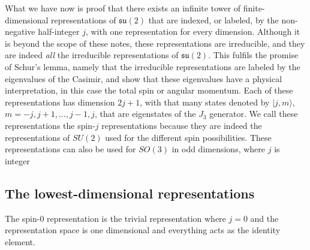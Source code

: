 \documentclass[notes.tex]{subfiles}
\begin{document}
What we have now is proof that there exists an infinite tower of finite-dimensional representations of $\mathfrak{su}(2)$ that are indexed, or labeled, by the non-negative half-integer $j$, with one representation for every dimension. Although it is beyond the scope of these notes, these representations are irreducible, and they are indeed {\it all} the irreducible representations of $\mathfrak{su}(2)$. This fulfils the promise of Schur's lemma, namely that the irreducible representations are labeled by the eigenvalues of the Casimir, and show that these eigenvalues have a physical interpretation, in this case the total spin or angular momentum. Each of these representations has dimension $2j+1$, with that many states denoted by $|j,m\rangle$, $m=-j,j+1,\ldots,j-1,j$, that are eigenstates of the $J_3$ generator. We call these representations the spin-$j$ representations because they are indeed the representations of $SU(2)$ used for the different spin possibilities.
These representations can also be used for $SO(3)$ in odd dimensions, where $j$ is integer

\subsection{The lowest-dimensional representations}
\label{sec:SU2_irreps}
The spin-0 representation is the trivial representation where $j=0$ and the representation space is one dimensional and everything acts as the identity element. 
\end{document}
